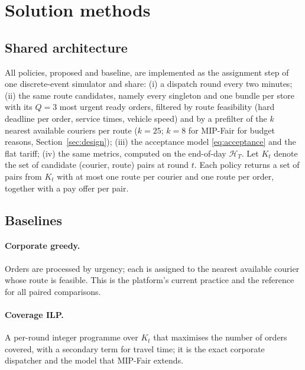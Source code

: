 \documentclass[preprint,12pt,authoryear]{elsarticle}%
\newcommand{\Hist}{\mathcal{H}}
\begin{document}
\section{Solution methods}
\label{sec:methods}

\subsection{Shared architecture}
\label{sec:shared}

All policies, proposed and baseline, are implemented as the assignment step of one discrete-event simulator and share: (i) a dispatch round every two minutes; (ii) the same route candidates, namely every singleton and one bundle per store with its $Q = 3$ most urgent ready orders, filtered by route feasibility (hard deadline per order, service times, vehicle speed) and by a prefilter of the $k$ nearest available couriers per route ($k = 25$; $k = 8$ for MIP-Fair for budget reasons, Section~\ref{sec:design}); (iii) the acceptance model \eqref{eq:acceptance} and the flat tariff; (iv) the same metrics, computed on the end-of-day $\Hist_T$. Let $K_t$ denote the set of candidate (courier, route) pairs at round $t$. Each policy returns a set of pairs from $K_t$ with at most one route per courier and one route per order, together with a pay offer per pair.

\subsection{Baselines}
\label{sec:baselines}

\paragraph{Corporate greedy.} Orders are processed by urgency; each is assigned to the nearest available courier whose route is feasible. This is the platform's current practice and the reference for all paired comparisons.

\paragraph{Coverage ILP.} A per-round integer programme over $K_t$ that maximises the number of orders covered, with a secondary term for travel time; it is the exact corporate dispatcher and the model that MIP-Fair extends.
\end{document}

